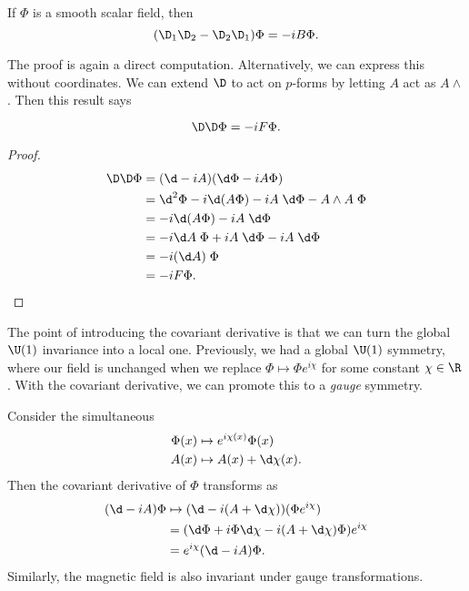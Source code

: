 \documentclass[a4paper]{article}
\begin{document}
\begin{prop}
  If $\Phi$ is a smooth scalar field, then
  \[
    (\D_1 \D_2 - \D_2 \D_1) \Phi = - i B \Phi.
  \]
\end{prop}

The proof is again a direct computation. Alternatively, we can express this without coordinates. We can extend $\D$ to act on $p$-forms by letting $A$ act as $A \wedge$. Then this result says
\begin{prop}
  \[
    \D \D \Phi = -i F \Phi.
  \]
\end{prop}

\begin{proof}
  \begin{align*}
    \D \D \Phi &= (\d - iA) (\d \Phi - iA\Phi)\\
    &= \d^2 \Phi - i \d (A \Phi) - iA\;\d \Phi - A \wedge A\;\Phi\\
    &= -i \d (A \Phi) - i A \;\d \Phi\\
    &= -i \d A\; \Phi + i A \;\d \Phi - i A\;\d \Phi\\
    &= -i (\d A)\; \Phi\\
    &= -i F \Phi.\qedhere
  \end{align*}
\end{proof}

The point of introducing the covariant derivative is that we can turn the global $\U(1)$ invariance into a local one. Previously, we had a global $\U(1)$ symmetry, where our field is unchanged when we replace $\Phi \mapsto \Phi e^{i \chi}$ for some constant $\chi \in \R$. With the covariant derivative, we can promote this to a \emph{gauge} symmetry.

Consider the simultaneous 
\begin{align*}
  \Phi(x) &\mapsto e^{i\chi(x)} \Phi(x)\\
  A(x) &\mapsto A(x) + \d \chi(x).
\end{align*}
Then the covariant derivative of $\Phi$ transforms as
\begin{align*}
  (\d - iA) \Phi &\mapsto (\d - i (A + \d \chi)) (\Phi e^{i \chi}) \\
  &= (\d \Phi + i \Phi \d \chi - i (A + \d \chi) \Phi) e^{i\chi} \\
  &= e^{i \chi} (\d - iA) \Phi.
\end{align*}
Similarly, the magnetic field is also invariant under gauge transformations.
\end{document}
